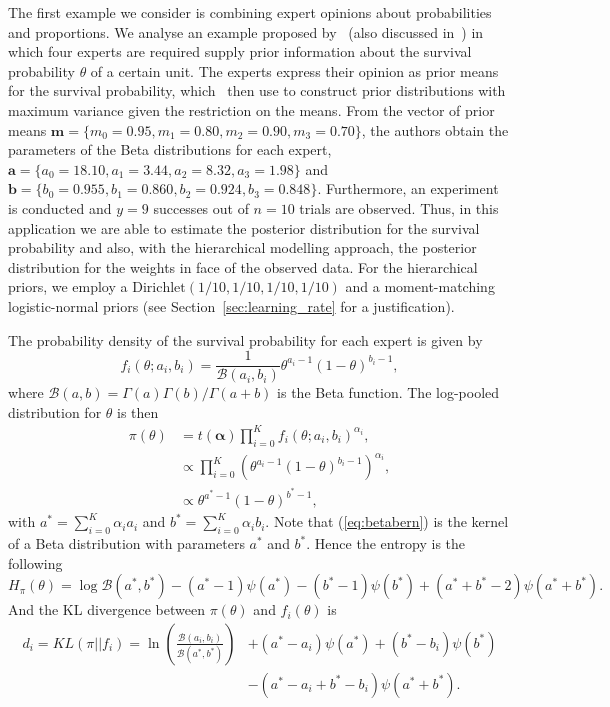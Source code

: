 \documentclass[a4paper, notitlepage, 10pt]{article}
\begin{document}
The first example we consider is combining expert opinions about probabilities and proportions.
We analyse an example proposed by~\cite{Savchuk1994} (also discussed in~\cite{Rufo2012B}) in which four experts are required supply prior information about the survival probability $\theta$ of a certain unit.
The experts express their opinion as prior means for the survival probability, which~\cite{Savchuk1994} then use to construct prior distributions with maximum variance given the restriction on the means.
From the vector of prior means $\mathbf{m} = \{ m_0 = 0.95, m_1 = 0.80, m_2 = 0.90, m_3 = 0.70 \}$, the authors obtain the parameters of the Beta distributions for each expert,  $\mathbf{a} = \{ a_0 = 18.10, a_1 = 3.44 , a_2 = 8.32, a_3 = 1.98 \}$ and  $\mathbf{b} = \{ b_0 = 0.955 , b_1 = 0.860, b_2 = 0.924, b_3 = 0.848\}$.
Furthermore, an experiment is conducted and $y = 9$ successes out of $n = 10$ trials are observed.
Thus, in this application we are able to estimate the posterior distribution for the survival probability and also, with  the hierarchical modelling approach, the posterior distribution for the weights in face of the observed data.
For the hierarchical priors, we employ a $\text{Dirichlet}(1/10, 1/10, 1/10, 1/10)$ and a moment-matching logistic-normal priors (see Section~\ref{sec:learning_rate} for a justification).

The probability density of the survival probability for each expert is given by
$$f_i(\theta;a_i, b_i) = \frac{1}{\mathcal{B}(a_i, b_i)} \theta^{a_i-1}(1-\theta)^{b_i-1},$$
where $\mathcal{B}(a,b)= \Gamma(a)\Gamma(b)/\Gamma(a + b)$ is the Beta function.
The log-pooled distribution for $\theta$ is then
\begin{align}
\nonumber
\pi(\theta) & = t(\boldsymbol\alpha)\prod_{i=0}^{K}f_i(\theta;a_i,b_i)^{\alpha_i},\\
\nonumber
            & \propto \prod_{i=0}^{K} \left(\theta^{a_i-1}(1-\theta)^{b_i-1} \right)^{\alpha_i},\\
\label{eq:betabern}
&\propto \theta^{a^*-1}(1-\theta)^{b^*-1},
\end{align}
with $a^* =\sum_{i=0}^{K}\alpha_ia_i$ and $b^* = \sum_{i=0}^{K}\alpha_ib_i$.
Note that (\ref{eq:betabern}) is the kernel of a Beta distribution with parameters $a^*$ and $b^*$. Hence the entropy is the following
\begin{equation}
 \label{eq:entropybeta}
 H_{\pi}(\theta) = \log \mathcal{B}(a^*,b^*) - (a^*-1)\psi(a^*) - (b^*-1)\psi(b^*) + (a^*+b^* -2)\psi(a^*+b^*).
\end{equation}
And the KL divergence between $\pi(\theta)$ and $f_i(\theta)$  is
\begin{equation}
\begin{split}
 \label{eq:KLbeta}
 d_i = KL(\pi || f_i) = \ln\left(\frac{\mathcal{B}(a_i, b_i)}{\mathcal{B}(a^*, 
b^*)}\right) & + (a^* - a_i) \psi(a^*)+ (b^* - b_i)\psi(b^*) \\
 &- (a^*-a_i + b^* - b_i)\psi(a^*+b^*).
\end{split}
\end{equation}
\end{document}
